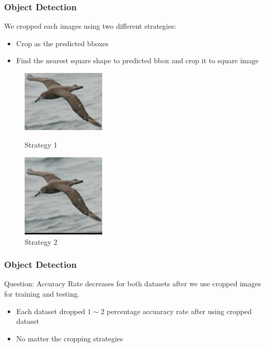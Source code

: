 \documentclass{beamer}
\begin{document}
        \begin{frame}
            \frametitle{Object Detection}
            We cropped each images using two different strategies:
            \begin{itemize}
                \item Crop as the predicted bboxes
                \item Find the nearest square shape to predicted bbox and crop it to square image
            \end{itemize}\par
            \begin{figure}[H]
                \centering
                \begin{minipage}[t]{0.48\textwidth}
                \centering
                \includegraphics[width=4cm]{./img/bird1.png}
                \caption{Strategy 1}
                \end{minipage}
                \begin{minipage}[t]{0.48\textwidth}
                \centering
                \includegraphics[width=4cm]{./img/bird2.png}
                \caption{Strategy 2}
                \end{minipage}
            \end{figure}\par
        \end{frame}
        \begin{frame}
            \frametitle{Object Detection}
            Question: Accuracy Rate decreases for both datasets after we use cropped images for training and testing.
            \begin{itemize}
                \item Each dataset dropped $1\sim 2$ percentage accuaracy rate after using cropped dataset
                \item No matter the cropping strategies
            \end{itemize}\par
        \end{frame}
\end{document}
